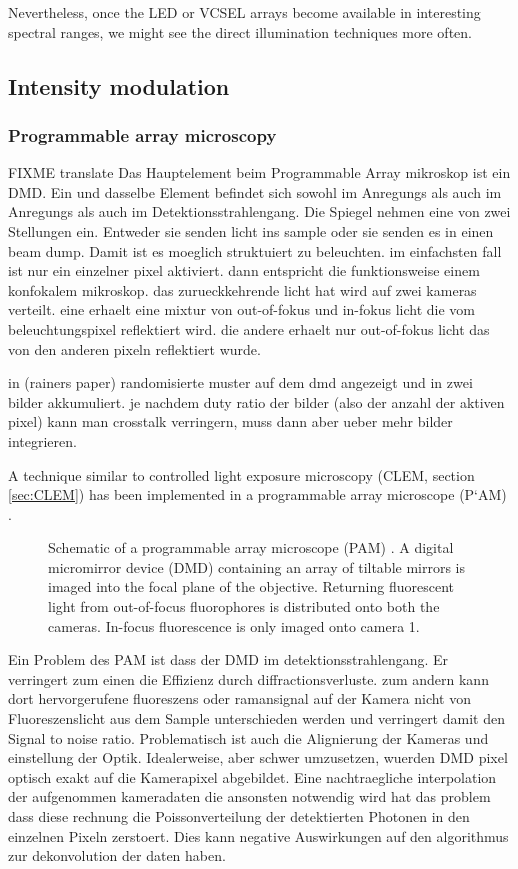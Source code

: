 Nevertheless, once the LED or VCSEL arrays become available in
interesting spectral ranges, we might see the direct illumination
techniques more often.

\subsection{Intensity modulation}
\subsubsection{Programmable array microscopy}
FIXME translate Das Hauptelement beim Programmable Array mikroskop ist
ein DMD. Ein und dasselbe Element befindet sich sowohl im Anregungs
als auch im Anregungs als auch im Detektionsstrahlengang. Die Spiegel
nehmen eine von zwei Stellungen ein. Entweder sie senden licht ins
sample oder sie senden es in einen beam dump. Damit ist es moeglich
struktuiert zu beleuchten. im einfachsten fall ist nur ein einzelner
pixel aktiviert. dann entspricht die funktionsweise einem konfokalem
mikroskop. das zurueckkehrende licht hat wird auf zwei kameras
verteilt.  eine erhaelt eine mixtur von out-of-fokus und in-fokus
licht die vom beleuchtungspixel reflektiert wird.  die andere erhaelt
nur out-of-fokus licht das von den anderen pixeln reflektiert wurde.

in (rainers paper) randomisierte muster auf dem dmd angezeigt und in
zwei bilder akkumuliert. je nachdem duty ratio der bilder (also der
anzahl der aktiven pixel) kann man crosstalk verringern, muss dann
aber ueber mehr bilder integrieren.

A technique similar to controlled light exposure microscopy (CLEM,
section \ref{sec:CLEM}) has been implemented in a programmable array
microscope (P`AM) \citep{Caarls2011}. 

\begin{figure}[!hbt]
  \centering
  \caption{Schematic of a programmable array microscope (PAM)
    \citep[inspired from][]{Verveer1998}. A digital micromirror
    device (DMD) containing an array of tiltable mirrors is imaged
    into the focal plane of the objective. Returning fluorescent light
    from out-of-focus fluorophores is distributed onto both the
    cameras. In-focus fluorescence is only imaged onto camera 1.}
  \label{fig:pam-sketch}
\end{figure}

Ein Problem des PAM ist dass der DMD im detektionsstrahlengang. Er
verringert zum einen die Effizienz durch diffractionsverluste. zum
andern kann dort hervorgerufene fluoreszens oder ramansignal auf der
Kamera nicht von Fluoreszenslicht aus dem Sample unterschieden werden
und verringert damit den Signal to noise ratio. Problematisch ist auch
die Alignierung der Kameras und einstellung der Optik. Idealerweise,
aber schwer umzusetzen, wuerden DMD pixel optisch exakt auf die
Kamerapixel abgebildet. Eine nachtraegliche interpolation der
aufgenommen kameradaten die ansonsten notwendig wird hat das problem
dass diese rechnung die Poissonverteilung der detektierten Photonen in
den einzelnen Pixeln zerstoert. Dies kann negative Auswirkungen auf
den algorithmus zur dekonvolution der daten haben.

